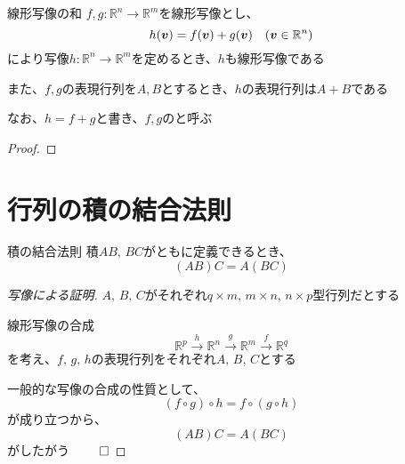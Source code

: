\documentclass[../../../topic_linear-algebra]{subfiles}
\begin{document}
\sectionline

\begin{theorem*}{線形写像の和}
  $f,g\colon \mathbb{R}^n \to \mathbb{R}^m$を線形写像とし、
  \begin{equation*}
    h(\vb*{v}) = f(\vb*{v}) + g(\vb*{v}) \quad (\vb*{v} \in \mathbb{R}^n)
  \end{equation*}
  により写像$h\colon \mathbb{R}^n \to \mathbb{R}^m$を定めるとき、$h$も線形写像である

  また、$f,g$の表現行列を$A,B$とするとき、$h$の表現行列は$A + B$である

  なお、$h = f + g$と書き、$f,g$のと呼ぶ
\end{theorem*}

\begin{proof}
\end{proof}

\sectionline
\section{行列の積の結合法則}

\begin{theorem*}{積の結合法則}
  積$AB, \, BC$がともに定義できるとき、
  \begin{equation*}
    (AB)C = A(BC)
  \end{equation*}
\end{theorem*}

\begin{proof}[写像による証明]
  $A,\,B, \, C$がそれぞれ$q \times m, \, m \times n, \, n \times p$型行列だとする

  線形写像の合成
  \begin{equation*}
    \mathbb{R}^p \xrightarrow{h} \mathbb{R}^n \xrightarrow{g} \mathbb{R}^m \xrightarrow{f} \mathbb{R}^q
  \end{equation*}
  を考え、$f,\, g, \, h$の表現行列をそれぞれ$A, \, B, \, C$とする

  一般的な写像の合成の性質として、
  \begin{equation*}
    (f \circ g) \circ h = f \circ (g \circ h)
  \end{equation*}
  が成り立つから、
  \begin{equation*}
    (AB)C = A(BC)
  \end{equation*}
  がしたがう $\qed$
\end{proof}
\end{document}
